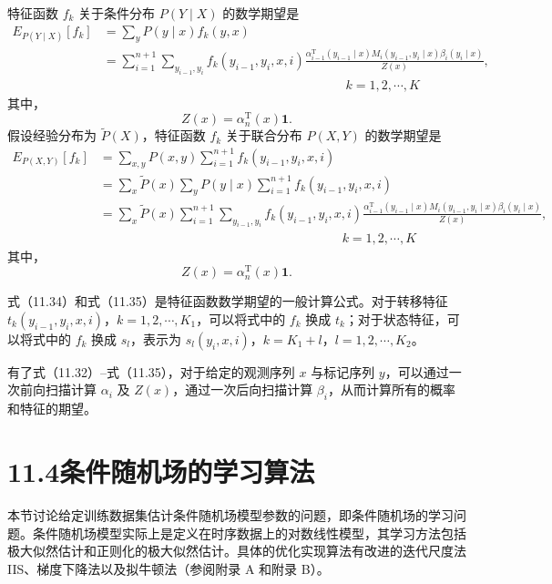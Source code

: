 \documentclass[UTF8, 12pt, fontset=fandol, oneside]{ctexart}
\begin{document}
特征函数 $f_k$ 关于条件分布 $P(Y\mid X)$ 的数学期望是
\begin{equation}
\begin{aligned}
E_{P(Y\mid X)}[f_k]
&=\sum_y P(y\mid x)f_k(y,x)\\
&=\sum_{i=1}^{n+1}\sum_{y_{i-1},y_i}
f_k(y_{i-1},y_i,x,i)
\frac{\alpha_{i-1}^{\mathrm T}(y_{i-1}\mid x)M_i(y_{i-1},y_i\mid x)\beta_i(y_i\mid x)}{Z(x)},\\
&\hspace{8cm} k=1,2,\cdots,K
\end{aligned}
\tag{11.34}
\end{equation}
其中，
\[
Z(x)=\alpha_n^{\mathrm T}(x)\mathbf{1}.
\]
假设经验分布为 $\tilde P(X)$，特征函数 $f_k$ 关于联合分布 $P(X,Y)$ 的数学期望是
\begin{equation}
\begin{aligned}
E_{P(X,Y)}[f_k]
&=\sum_{x,y}P(x,y)\sum_{i=1}^{n+1}f_k(y_{i-1},y_i,x,i)\\
&=\sum_x\tilde P(x)\sum_yP(y\mid x)\sum_{i=1}^{n+1}f_k(y_{i-1},y_i,x,i)\\
&=\sum_x\tilde P(x)\sum_{i=1}^{n+1}\sum_{y_{i-1},y_i}
f_k(y_{i-1},y_i,x,i)
\frac{\alpha_{i-1}^{\mathrm T}(y_{i-1}\mid x)M_i(y_{i-1},y_i\mid x)\beta_i(y_i\mid x)}{Z(x)},\\
&\hspace{8cm} k=1,2,\cdots,K
\end{aligned}
\tag{11.35}
\end{equation}
其中，
\[
Z(x)=\alpha_n^{\mathrm T}(x)\mathbf{1}.
\]

式（11.34）和式（11.35）是特征函数数学期望的一般计算公式。对于转移特征 $t_k(y_{i-1},y_i,x,i)$，$k=1,2,\cdots,K_1$，可以将式中的 $f_k$ 换成 $t_k$；对于状态特征，可以将式中的 $f_k$ 换成 $s_l$，表示为 $s_l(y_i,x,i)$，$k=K_1+l$，$l=1,2,\cdots,K_2$。

有了式（11.32）--式（11.35），对于给定的观测序列 $x$ 与标记序列 $y$，可以通过一次前向扫描计算 $\alpha_i$ 及 $Z(x)$，通过一次后向扫描计算 $\beta_i$，从而计算所有的概率和特征的期望。

\section*{11.4\quad 条件随机场的学习算法}

本节讨论给定训练数据集估计条件随机场模型参数的问题，即条件随机场的学习问题。条件随机场模型实际上是定义在时序数据上的对数线性模型，其学习方法包括极大似然估计和正则化的极大似然估计。具体的优化实现算法有改进的迭代尺度法 IIS、梯度下降法以及拟牛顿法（参阅附录 A 和附录 B）。
\end{document}
